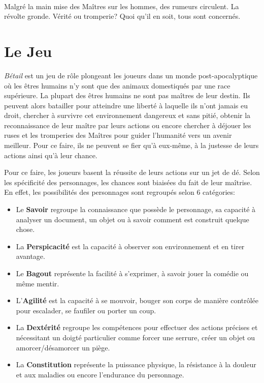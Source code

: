 \paragraph{}
Malgré la main mise des Maîtres sur les hommes, des rumeurs circulent. La révolte gronde. Vérité ou tromperie? Quoi qu'il en soit, tous sont concernés.

\section{Le Jeu}

\emph{Bétail} est un jeu de rôle plongeant les joueurs dans un monde post-apocalyptique où les êtres humains n'y sont que des animaux domestiqués par une race supérieure. La plupart des êtres humains ne sont pas maîtres de leur destin. Ils peuvent alors batailler pour atteindre une liberté à laquelle ils n'ont jamais eu droit, chercher à survivre cet environnement dangereux et sans pitié, obtenir la reconnaissance de leur maître par leurs actions ou encore chercher à déjouer les ruses et les tromperies des Maîtres pour guider l'humanité vers un avenir meilleur. Pour ce faire, ils ne peuvent se fier qu'à eux-même, à la justesse de leurs actions ainsi qu'à leur chance.

Pour ce faire, les joueurs basent la réussite de leurs actions sur un jet de dé. Selon les spécificité des personnages, les chances sont biaisées du fait de leur maîtrise. En effet, les possibilités des personnages sont regroupés selon $6$ catégories:
\begin{itemize}
    \item Le \textbf{Savoir} regroupe la connaissance que possède le personnage, sa capacité à analyser un document, un objet ou à savoir comment est construit quelque chose.
    \item La \textbf{Perspicacité} est la capacité à observer son environnement et en tirer avantage.
    \item Le \textbf{Bagout} représente la facilité à s'exprimer, à savoir jouer la comédie ou même mentir.
    \item L'\textbf{Agilité} est la capacité à se mouvoir, bouger son corps de manière contrôlée pour escalader, se faufiler ou porter un coup.
    \item La \textbf{Dextérité} regroupe les compétences pour effectuer des actions précises et nécessitant un doigté particulier comme forcer une serrure, créer un objet ou amorcer/désamorcer un piège.
    \item La \textbf{Constitution} représente la puissance physique, la résistance à la douleur et aux maladies ou encore l'endurance du personnage.
\end{itemize}

